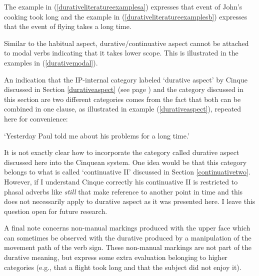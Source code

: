 \noindent The example in (\ref{durativeliteratureexamplesa}) expresses that event of John's cooking took long and the example in (\ref{durativeliteratureexamplesb}) expresses that the event of flying takes a long time.

Similar to the habitual aspect, durative/continuative aspect cannot be attached to modal verbs indicating that it takes lower scope. This is illustrated in the examples in (\ref{durativemodal}). 


\begin{exe}
\ex\label{durativemodal}\begin{xlist}
\end{xlist}
\end{exe}

\noindent An indication that the IP-internal category labeled `durative aspect' by Cinque discussed in Section \ref{durativeaspect} (see page \pageref{durativeaspect}) and the category discussed in this section are two different categories comes from the fact that both can be combined in one clause, as illustrated in example (\ref{durativeaspect}), repeated here for convenience:


\begin{exe}
\glt `Yesterday Paul told me about his problems for a long time.' \label{ex:durativetwodgstwo}
\end{exe} 

\noindent It is not exactly clear how to incorporate the category called durative aspect discussed here into the Cinquean system. One idea would be that this category belongs to what is called `continuative II' discussed in Section \ref{continuativetwo}. However, if I understand Cinque correctly his continuative II is restricted to phasal adverbs like \textit{still} that make reference to another point in time and this does not necessarily apply to durative aspect as it was presented here. I leave this question open for future research.

A final note concerns non-manual markings produced with the upper face which can sometimes be observed with the durative produced by a manipulation of the movement path of the verb sign. These non-manual markings are not part of the durative meaning, but express some extra evaluation belonging to higher categories (e.g., that a flight took long and that the subject did not enjoy it).

